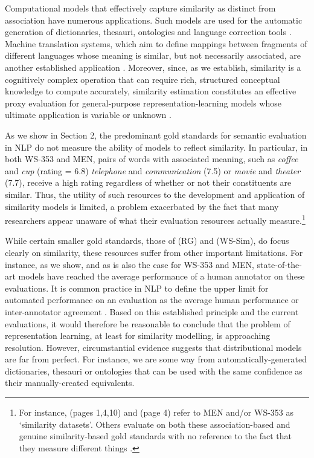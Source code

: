 Computational models that effectively capture similarity as distinct from association have numerous applications. Such models are used for the automatic generation of dictionaries, thesauri, ontologies and language correction tools \cite{cimiano2005learning,biemann2005ontology,li2006exploring}. Machine translation systems, which aim to define mappings between fragments of different languages whose meaning is similar, but not necessarily associated, are another established application \cite{he2008indirect,marton2009improved}. Moreover, since, as we establish, similarity is a cognitively complex operation that can require rich, structured conceptual knowledge to compute accurately, similarity estimation constitutes an effective proxy evaluation for general-purpose representation-learning models whose ultimate application is variable or unknown \cite{collobert2008unified,baroni2010distributional}.

As we show in Section 2, the predominant gold standards for semantic evaluation in NLP do not measure the ability of models to reflect similarity. In particular, in both WS-353 and MEN, pairs of words with associated meaning, such as \emph{coffee} and \emph{cup} (rating = 6.8) \emph{telephone} and \emph{communication} (7.5) or \emph{movie} and \emph{theater} (7.7), receive a high rating regardless of whether or not their constituents are similar. Thus, the utility of such resources to the development and application of similarity models is limited, a problem exacerbated by the fact that many researchers appear unaware of what their evaluation resources actually measure.\footnote{For instance,  \cite{huang2012improving} (pages 1,4,10) and \cite{reisinger2010multi} (page 4) refer to MEN and/or WS-353 as `similarity datasets'. Others evaluate on both these association-based and genuine similarity-based gold standards with no reference to the fact that they measure different things \cite{medelyan2009mining,li2014obtaining}.} 

While certain smaller gold standards, those of \cite{rubenstein1965contextual} (RG) and \cite{agirre2009study} (WS-Sim), do focus clearly on similarity, these resources suffer from other important limitations. For instance, as we show, and as is also the case for WS-353 and MEN, state-of-the-art models have reached the average performance of a human annotator on these evaluations. It is common practice in NLP to define the upper limit for automated performance on an evaluation as the average human performance or inter-annotator agreement \cite{yong1999case,cunningham2005information,resnik201011}. Based on this established principle and the current evaluations, it would therefore be reasonable to conclude that the problem of representation learning, at least for similarity modelling, is approaching resolution. However, circumstantial evidence suggests that distributional models are far from perfect. For instance, we are some way from automatically-generated dictionaries, thesauri or ontologies that can be used with the same confidence as their manually-created equivalents.   

